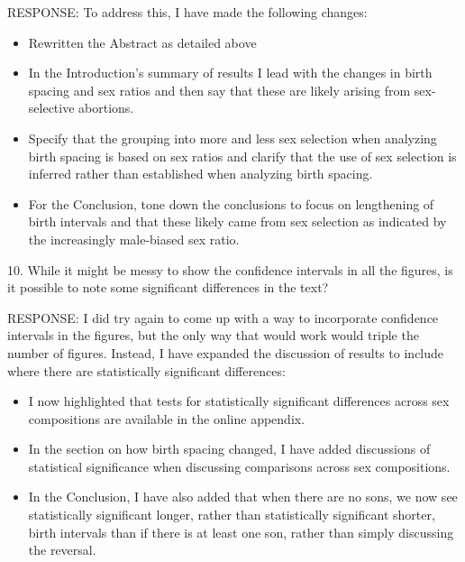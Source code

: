 \documentclass[letterpaper,12pt]{article}
\begin{document}
RESPONSE:  To address this, I have made the following changes:
\begin{itemize}
\item Rewritten the Abstract as detailed above
\item In the Introduction's summary of results I lead with the changes in birth spacing and 
sex ratios and then say that these are likely arising from sex-selective abortions.
\item Specify that the grouping into more and less sex selection when analyzing birth spacing 
is based on sex ratios and clarify that the use of sex selection is inferred rather than 
established when analyzing birth spacing.
\item For the Conclusion, tone down the conclusions to focus on lengthening of birth intervals and 
that these likely came from sex selection as indicated by the increasingly male-biased sex ratio.
\end{itemize}

10. While it might be messy to show the confidence intervals in all the figures, is it
possible to note some significant differences in the text?

RESPONSE: I did try again to come up with a way to incorporate confidence intervals in the figures,
but the only way that would work would triple the number of figures.
Instead, I have expanded the discussion of results to include where there are statistically
significant differences:
\begin{itemize}
\item I now highlighted that tests for statistically significant differences across sex compositions 
are available in the online appendix.
\item In the section on how birth spacing changed, I have added discussions of statistical significance 
when discussing comparisons across sex compositions.
\item In the Conclusion, I have also added that when there are no sons, we now see statistically 
significant longer, rather than statistically significant shorter, birth intervals than if there 
is at least one son, rather than simply discussing the reversal.
\end{itemize}

\newpage


\end{document}
